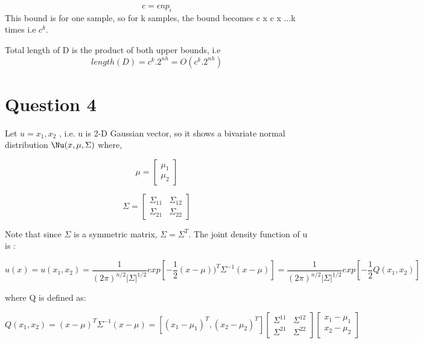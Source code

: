 \documentclass[12pt,a4paper]{article}
\begin{document}
\begin{equation*}
    c = \epsilon np_i
\end{equation*}
This bound is for one sample, so for k samples, the bound becomes c x c x ...k times i.e $c^k$.

Total length of D is the product of both upper bounds, i.e
\begin{equation*}

length(D) = c^k.2^{nh} = O(c^k.2^{nh})    
\end{equation*}


\section*{Question 4}
Let $u = {x_1,x_2}$ , i.e. u is 2-D Gaussian vector, so it shows a bivariate normal distribution $\Nu(x,\mu,\Sigma)$ where, 

\begin{equation*}
\mu = \begin{bmatrix}
\mu_1\\ 
\mu_2
\end{bmatrix}
\end{equation*}

\begin{equation*}
\Sigma = \begin{bmatrix}
\Sigma_{11} & \Sigma_{12} \\ 
\Sigma_{21} & \Sigma_{22} 
\end{bmatrix}
\end{equation*}

Note that since $\Sigma$ is a symmetric matrix, $\Sigma = \Sigma^T$.
The joint density function of u is :

\begin{equation*}
u(x) = u(x_1,x_2) = \frac{1}{(2\pi )^{n/2}|\Sigma|^{1/2}}exp[-\frac{1}{2}(x-\mu))^T\Sigma^{-1}(x-\mu)] =  \frac{1}{(2\pi )^{n/2}|\Sigma|^{1/2}}exp[-\frac{1}{2}Q(x_1,x_2)]
\end{equation*}

where Q is defined as:

\begin{equation*}

Q(x_1,x_2) = (x-\mu)^T\Sigma^{-1}(x-\mu) 
		 = [(x_1-\mu_1)^T,(x_2-\mu_2)^T]\begin{bmatrix}\Sigma^{11} & \Sigma^{12} \\ 
\Sigma^{21} & \Sigma^{22} 
\end{bmatrix} \begin{bmatrix}x_1-\mu_1 \\ x_2-\mu_2 \end{bmatrix}

\end{equation*}
\end{document}
